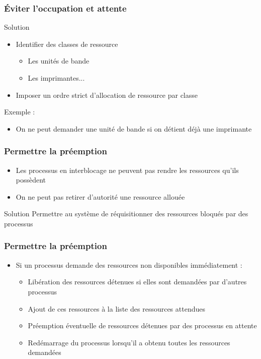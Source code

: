 \begin{frame}
\frametitle{Éviter l’occupation et attente}
\begin{block}{Solution}
\begin{itemize}
\item Identifier des classes de ressource
\begin{itemize}
\item Les unités de bande
\item Les imprimantes...
\end{itemize}
\item Imposer un ordre strict d’allocation de ressource par classe
\end{itemize}
\end{block}

Exemple :
\begin{itemize}
\item On ne peut demander une unité de bande si on détient déjà une imprimante
\end{itemize}
\end{frame}

\begin{frame}
\frametitle{Permettre la préemption}
\begin{itemize}
\item Les processus en interblocage ne peuvent pas rendre les ressources qu’ils possèdent
\item On ne peut pas retirer d'autorité une ressource allouée
\end{itemize}
\begin{block}{Solution}
Permettre au système de réquisitionner des ressources bloqués par des processus
\end{block}
\end{frame}

\begin{frame}
\frametitle{Permettre la préemption}
\begin{itemize}
\item Si un processus demande des ressources non disponibles immédiatement :
\begin{itemize}
\item <1->Libération des ressources détenues si elles sont demandées par d’autres processus
\item <2->Ajout de ces ressources à la liste des ressources attendues
\item <3->Préemption éventuelle de ressources détenues par des processus en attente
\item <4->Redémarrage du processus lorsqu’il a obtenu toutes les ressources demandées
\end{itemize}
\end{itemize}
\end{frame}

